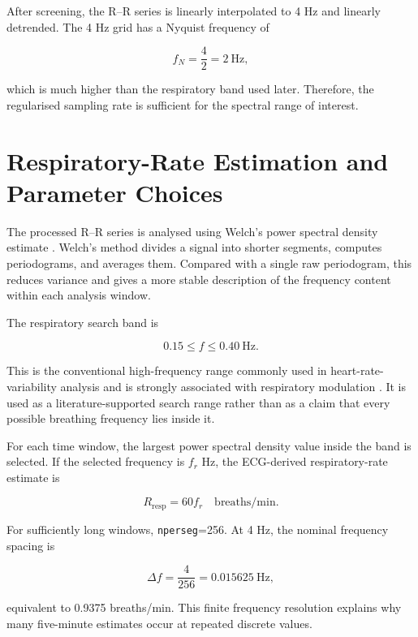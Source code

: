 \documentclass[a4paper,10.5pt,oneside]{report}
\begin{document}
After screening, the R--R series is linearly interpolated to 4 Hz and linearly
detrended. The 4 Hz grid has a Nyquist frequency of

\begin{equation}
    f_N=\frac{4}{2}=2~\mathrm{Hz},
\end{equation}

which is much higher than the respiratory band used later. Therefore, the
regularised sampling rate is sufficient for the spectral range of interest.

\section{Respiratory-Rate Estimation and Parameter Choices}

The processed R--R series is analysed using Welch's power spectral density
estimate \citep{welch1967}. Welch's method divides a signal into shorter
segments, computes periodograms, and averages them. Compared with a single raw
periodogram, this reduces variance and gives a more stable description of the
frequency content within each analysis window.

The respiratory search band is

\[
0.15\leq f\leq0.40~\mathrm{Hz}.
\]

This is the conventional high-frequency range commonly used in
heart-rate-variability analysis and is strongly associated with respiratory
modulation \citep{taskforce1996}. It is used as a literature-supported search
range rather than as a claim that every possible breathing frequency lies
inside it.

For each time window, the largest power spectral density value inside the band
is selected. If the selected frequency is $f_r$ Hz, the ECG-derived
respiratory-rate estimate is

\begin{equation}
    R_{\mathrm{resp}}=60f_r
    \quad\text{breaths/min}.
    \label{eq:bpm}
\end{equation}

For sufficiently long windows, \texttt{nperseg}=256. At 4 Hz, the nominal
frequency spacing is

\begin{equation}
    \Delta f=\frac{4}{256}=0.015625~\mathrm{Hz},
\end{equation}

equivalent to 0.9375 breaths/min. This finite frequency resolution explains why
many five-minute estimates occur at repeated discrete values.
\end{document}
